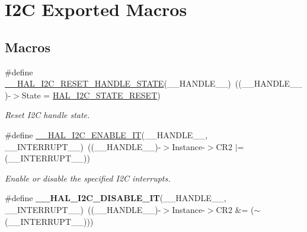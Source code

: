 \hypertarget{group___i2_c___exported___macros}{}\section{I2C Exported Macros}
\label{group___i2_c___exported___macros}
\subsection*{Macros}
\begin{DoxyCompactItemize}
\item 
\#define \hyperlink{group___i2_c___exported___macros_ga74c8fd72a78882720c28448ce8bd33d8}{\+\_\+\+\_\+\+H\+A\+L\+\_\+\+I2\+C\+\_\+\+R\+E\+S\+E\+T\+\_\+\+H\+A\+N\+D\+L\+E\+\_\+\+S\+T\+A\+TE}(\+\_\+\+\_\+\+H\+A\+N\+D\+L\+E\+\_\+\+\_\+)~((\+\_\+\+\_\+\+H\+A\+N\+D\+L\+E\+\_\+\+\_\+)-\/$>$State = \hyperlink{group___i2_c___exported___types_ggaef355af8eab251ae2a19ee164ad81c37a91ba08634e08d7287940f1bc5a37eeff}{H\+A\+L\+\_\+\+I2\+C\+\_\+\+S\+T\+A\+T\+E\+\_\+\+R\+E\+S\+ET})
\begin{DoxyCompactList}\small\item\em Reset I2C handle state. \end{DoxyCompactList}\item 
\#define \hyperlink{group___i2_c___exported___macros_gac9d8b249b06b2d30f987acc9ceebd1d9}{\+\_\+\+\_\+\+H\+A\+L\+\_\+\+I2\+C\+\_\+\+E\+N\+A\+B\+L\+E\+\_\+\+IT}(\+\_\+\+\_\+\+H\+A\+N\+D\+L\+E\+\_\+\+\_\+,  \+\_\+\+\_\+\+I\+N\+T\+E\+R\+R\+U\+P\+T\+\_\+\+\_\+)~((\+\_\+\+\_\+\+H\+A\+N\+D\+L\+E\+\_\+\+\_\+)-\/$>$Instance-\/$>$C\+R2 $\vert$= (\+\_\+\+\_\+\+I\+N\+T\+E\+R\+R\+U\+P\+T\+\_\+\+\_\+))
\begin{DoxyCompactList}\small\item\em Enable or disable the specified I2C interrupts. \end{DoxyCompactList}\item 
\#define {\bfseries \+\_\+\+\_\+\+H\+A\+L\+\_\+\+I2\+C\+\_\+\+D\+I\+S\+A\+B\+L\+E\+\_\+\+IT}(\+\_\+\+\_\+\+H\+A\+N\+D\+L\+E\+\_\+\+\_\+,  \+\_\+\+\_\+\+I\+N\+T\+E\+R\+R\+U\+P\+T\+\_\+\+\_\+)~((\+\_\+\+\_\+\+H\+A\+N\+D\+L\+E\+\_\+\+\_\+)-\/$>$Instance-\/$>$C\+R2 \&= ($\sim$(\+\_\+\+\_\+\+I\+N\+T\+E\+R\+R\+U\+P\+T\+\_\+\+\_\+)))\hypertarget{group___i2_c___exported___macros_ga33d0c7202ae298fa3ae128c5da49d455}{}\label{group___i2_c___exported___macros_ga33d0c7202ae298fa3ae128c5da49d455}


\end{DoxyCompactItemize}
